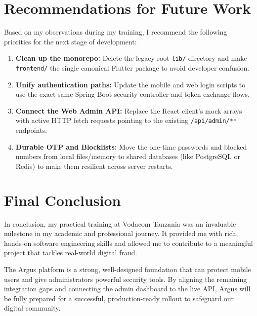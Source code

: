 \section{Recommendations for Future Work}
Based on my observations during my training, I recommend the following priorities for the next stage of development:
\begin{enumerate}
  \item \textbf{Clean up the monorepo:} Delete the legacy root \texttt{lib/} directory and make \texttt{frontend/} the single canonical Flutter package to avoid developer confusion.
  \item \textbf{Unify authentication paths:} Update the mobile and web login scripts to use the exact same Spring Boot security controller and token exchange flows.
  \item \textbf{Connect the Web Admin API:} Replace the React client's mock arrays with active HTTP fetch requests pointing to the existing \texttt{/api/admin/**} endpoints.
  \item \textbf{Durable OTP and Blocklists:} Move the one-time passwords and blocked numbers from local files/memory to shared databases (like PostgreSQL or Redis) to make them resilient across server restarts.
\end{enumerate}

\section{Final Conclusion}
In conclusion, my practical training at Vodacom Tanzania was an invaluable milestone in my academic and professional journey. It provided me with rich, hands-on software engineering skills and allowed me to contribute to a meaningful project that tackles real-world digital fraud. 

The Argus platform is a strong, well-designed foundation that can protect mobile users and give administrators powerful security tools. By aligning the remaining integration gaps and connecting the admin dashboard to the live API, Argus will be fully prepared for a successful, production-ready rollout to safeguard our digital community.
